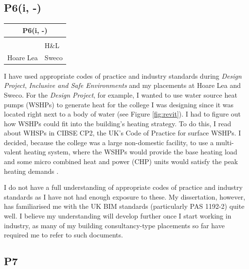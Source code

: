 \subsection*{P6(i, -)}

\begin{table}
	\begin{tabular}{|ll|}
		\hline
		\multicolumn{2}{|c|}{\cellcolor[HTML]{F8A102}\textbf{P6(i, -) \littlemaster}} \\ \hline
		\PRJ & \DST \\
		\ISE & H\&L \\
		Hoare Lea & Sweco \\ \hline
	\end{tabular}
\end{table}

I have used appropriate codes of practice and industry standards during \textit{Design Project}, \textit{Inclusive and Safe Environments} and my placements at Hoare Lea and Sweco.
For the \textit{Design Project}, for example, I wanted to use water source heat pumps (WSHPs) to generate heat for the college I was designing since it was located right next to a body of water (see Figure \ref{fig:revit}).
I had to figure out how WSHPs could fit into the building's heating strategy.
To do this, I read about WHSPs in CIBSE CP2, the UK's Code of Practice for surface WSHPs.
I decided, because the college was a large non-domestic facility, to use a multi-valent heating system, where the WSHPs would provide the base heating load and some micro combined heat and power (CHP) units would satisfy the peak heating demands \citep[pp.~12,~38]{CP22016}.

I do not have a full understanding of appropriate codes of practice and industry standards as I have not had enough exposure to these.
My dissertation, however, has familiarised me with the UK BIM standards (particularly PAS 1192-2) quite well.
I believe my understanding will develop further once I start working in industry, as many of my building consultancy-type placements so far have required me to refer to such documents.






\subsection*{P7}

